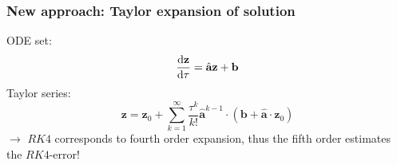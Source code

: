 \documentclass{beamer}
\newcommand{\rd}{{\rm d}}
\begin{document}
\begin{frame}
\frametitle{New approach: Taylor expansion of solution}
\vspace{0cm}
ODE set: $$\frac{\rd \textbf{z}}{\rd \tau} = \hat{\textbf{a}}\textbf{z} + \textbf{b}$$ \newline
\vspace{0cm}
Taylor series: $$\textbf{z}=\textbf{z}_0 + \sum\limits_{k=1}^\infty \frac{\tau^k}{k!}\hat{\textbf{a}}^{k-1}\cdot (\textbf{b} + \hat{ \textbf{a}} \cdot\textbf{z}_0)$$ \newline
$\rightarrow$ $RK4$ corresponds to fourth order expansion, thus the fifth order estimates the $RK4$-error!
\end{frame}

%
\end{document}
